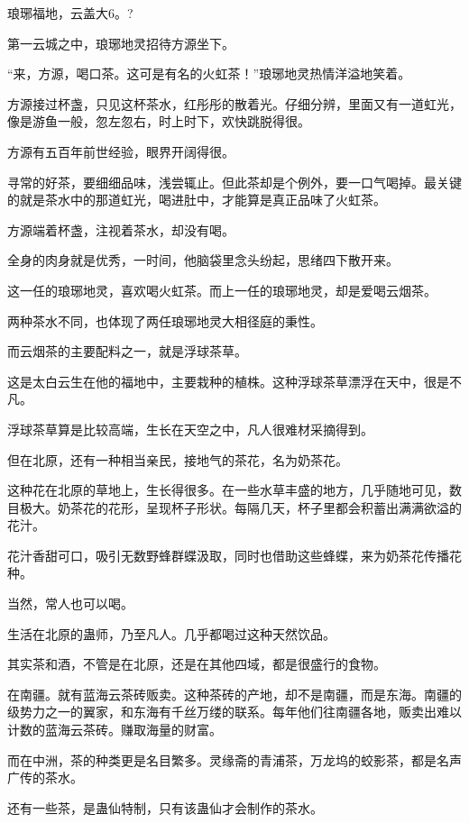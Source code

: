
\begin{this_body}

琅琊福地，云盖大6。?

第一云城之中，琅琊地灵招待方源坐下。

“来，方源，喝口茶。这可是有名的火虹茶！”琅琊地灵热情洋溢地笑着。

方源接过杯盏，只见这杯茶水，红彤彤的散着光。仔细分辨，里面又有一道虹光，像是游鱼一般，忽左忽右，时上时下，欢快跳脱得很。

方源有五百年前世经验，眼界开阔得很。

寻常的好茶，要细细品味，浅尝辄止。但此茶却是个例外，要一口气喝掉。最关键的就是茶水中的那道虹光，喝进肚中，才能算是真正品味了火虹茶。

方源端着杯盏，注视着茶水，却没有喝。

全身的肉身就是优秀，一时间，他脑袋里念头纷起，思绪四下散开来。

这一任的琅琊地灵，喜欢喝火虹茶。而上一任的琅琊地灵，却是爱喝云烟茶。

两种茶水不同，也体现了两任琅琊地灵大相径庭的秉性。

而云烟茶的主要配料之一，就是浮球茶草。

这是太白云生在他的福地中，主要栽种的植株。这种浮球茶草漂浮在天中，很是不凡。

浮球茶草算是比较高端，生长在天空之中，凡人很难材采摘得到。

但在北原，还有一种相当亲民，接地气的茶花，名为奶茶花。

这种花在北原的草地上，生长得很多。在一些水草丰盛的地方，几乎随地可见，数目极大。奶茶花的花形，呈现杯子形状。每隔几天，杯子里都会积蓄出满满欲溢的花汁。

花汁香甜可口，吸引无数野蜂群蝶汲取，同时也借助这些蜂蝶，来为奶茶花传播花种。

当然，常人也可以喝。

生活在北原的蛊师，乃至凡人。几乎都喝过这种天然饮品。

其实茶和酒，不管是在北原，还是在其他四域，都是很盛行的食物。

在南疆。就有蓝海云茶砖贩卖。这种茶砖的产地，却不是南疆，而是东海。南疆的级势力之一的翼家，和东海有千丝万缕的联系。每年他们往南疆各地，贩卖出难以计数的蓝海云茶砖。赚取海量的财富。

而在中洲，茶的种类更是名目繁多。灵缘斋的青浦茶，万龙坞的蛟影茶，都是名声广传的茶水。

还有一些茶，是蛊仙特制，只有该蛊仙才会制作的茶水。


\end{this_body}
